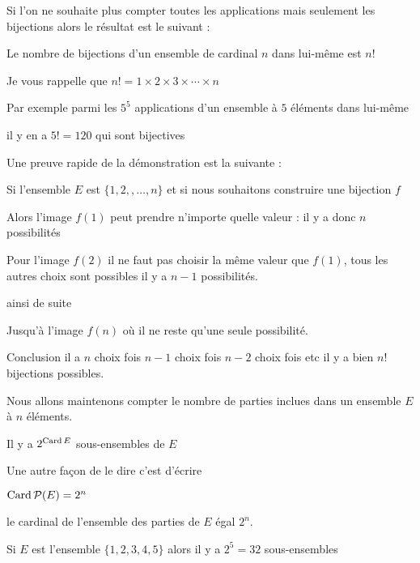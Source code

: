 \diapo

Si l'on ne souhaite plus compter toutes les applications 
mais seulement les bijections alors le résultat est le suivant :

\change


Le nombre de bijections d'un ensemble de cardinal $n$ dans lui-même
est $n!$


Je vous rappelle que $n!=1\times 2 \times 3 \times \cdots \times n$

\change

Par exemple parmi les $5^5$ applications d'un ensemble à $5$ éléments dans lui-même

il y en a $5! = 120$ qui sont bijectives


\change

Une preuve rapide de la démonstration est la suivante :

Si l'ensemble $E$ est $\{1,2,,\ldots,n\}$
et si nous souhaitons construire une bijection $f$


Alors l'image $f(1)$ peut prendre n'importe quelle valeur  : il y a donc $n$ possibilités


\change

Pour l'image $f(2)$ il ne faut pas choisir la même valeur que $f(1)$, tous les autres choix sont possibles
il y a $n-1$ possibilités.

\change

ainsi de suite

\change

Jusqu'à l'image $f(n)$ où il ne reste qu'une seule possibilité.

Conclusion il a $n$ choix fois $n-1$ choix fois $n-2$ choix fois  etc 
il y a bien $n!$ bijections possibles.

\diapo

Nous allons maintenons compter le nombre de parties inclues dans un ensemble $E$ à $n$ éléments.


Il y a $2^{\mathop{\text{Card}}\nolimits E}$ sous-ensembles de $E$ 

\change

Une autre façon de le dire c'est d'écrire

$\mathop{\text{Card}}\nolimits \mathcal{P}(E) = 2^n$

le cardinal de l'ensemble des parties de $E$ égal $2^n$.

\change


Si $E$ est l'ensemble $\{1,2,3,4,5\}$ alors il y a $2^5 = 32$ sous-ensembles

